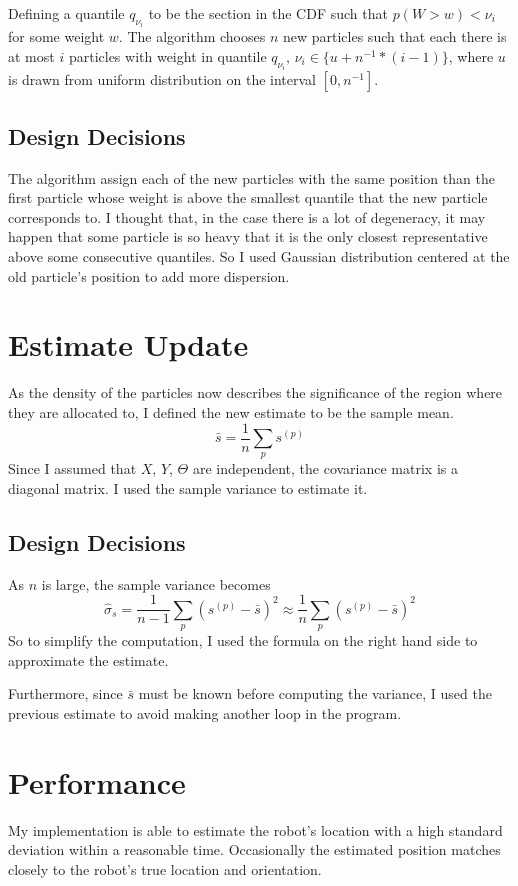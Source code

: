 \documentclass[10pt]{article}
\begin{document}
Defining a quantile $q_{\nu_i}$ to be the section in the CDF such that $p(W > w) < \nu_i$ for some weight $w$. The algorithm chooses $n$ new particles such that each there is at most $i$ particles with weight in quantile $q_{\nu_i}$, $\nu_i\in \{u +n^{-1}*(i-1)\}$, where $u$ is drawn from uniform distribution on the interval $[0, n^{-1}]$.

\subsection{Design Decisions}
The algorithm assign each of the new particles with the same position than the first particle whose weight is above the smallest quantile that the new particle corresponds to. I thought that, in the case there is a lot of degeneracy, it may happen that some particle is so heavy that it is the only closest representative above some consecutive quantiles. So I used Gaussian distribution centered at the old particle's position to add more dispersion.
 
\section{Estimate Update}
As the density of the particles now describes the significance of the region where they are allocated to, I defined the new estimate to be the sample mean.
\begin{displaymath}
	\bar{s} = \frac{1}{n}\sum_{p} s^{(p)}
\end{displaymath}
Since I assumed that $X$, $Y$, $\Theta$ are independent, the covariance matrix is a diagonal matrix. I used the sample variance to estimate it. 

\subsection{Design Decisions}
As $n$ is large, the sample variance becomes
\begin{displaymath}
	\hat{\sigma}_s = \frac{1}{n-1}\sum_{p}(s^{(p)}-\bar{s})^2 \approx \frac{1}{n}\sum_{p}(s^{(p)}-\bar{s})^2
\end{displaymath}
So to simplify the computation, I used the formula on the right hand side to approximate the estimate. 

Furthermore, since $\bar{s}$ must be known before computing the variance, I used the previous estimate to avoid making another loop in the program. 

\section{Performance}
My implementation is able to estimate the robot's location with a high standard deviation within a reasonable time. Occasionally the estimated position matches closely to the robot's true location and orientation. 
\end{document}
